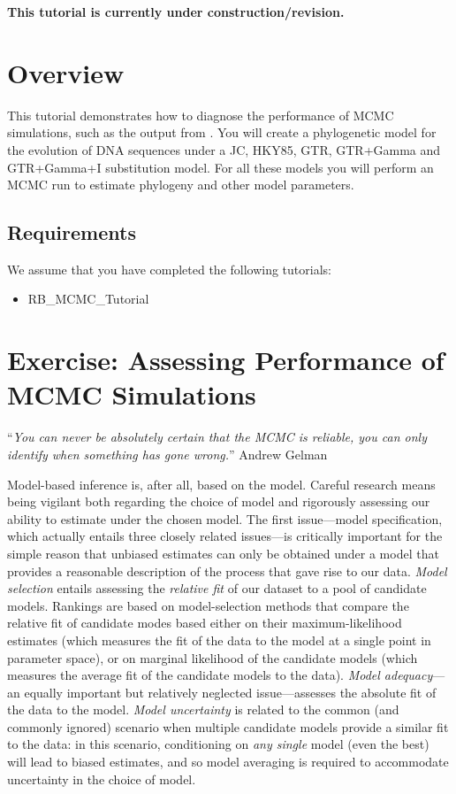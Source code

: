 \bigskip
\begin{center}
\textbf{\Large \color{red}This tutorial is currently under construction/revision.}
\end{center}
\bigskip



\section{Overview}


This tutorial demonstrates how to diagnose the performance of MCMC simulations, such as the output from \RevBayes.
You will create a phylogenetic model for the evolution of DNA sequences under a JC, HKY85, GTR, GTR+Gamma and GTR+Gamma+I substitution model.
For all these models you will perform an MCMC run to estimate phylogeny and other model parameters.

\subsection*{Requirements}
We assume that you have completed the following tutorials:
\begin{itemize}
\item RB\_MCMC\_Tutorial
\end{itemize}



\newpage
\FloatBarrier
\section{Exercise: Assessing Performance of MCMC Simulations}

``{\it You can never be absolutely certain that the MCMC is reliable, you can only identify when something has gone wrong.}'' Andrew Gelman

\bigskip
Model-based inference is, after all, based on the model.
Careful research means being vigilant both regarding the choice of model and rigorously assessing our ability to estimate under the chosen model. 
The first issue---model specification, which actually entails three closely related issues---is critically important for the simple reason that unbiased estimates can only be obtained under a model that provides a reasonable description of the process that gave rise to our data. 
{\it Model selection} entails assessing the {\it relative fit} of our dataset to a pool of candidate models. 
Rankings are based on model-selection methods that compare the relative fit of candidate modes based either on their maximum-likelihood estimates (which measures the fit of the data to the model at a single point in parameter space), or on marginal likelihood of the candidate models (which measures the average fit of the candidate models to the data). 
{\it Model adequacy}---an equally important but relatively neglected issue---assesses the absolute fit of the data to the model. 
{\it Model uncertainty} is related to the common (and commonly ignored) scenario when multiple candidate models provide a similar fit to the data: in this scenario, conditioning on {\it any single} model (even the best) will lead to biased estimates, and so model averaging is required to accommodate uncertainty in the choice of model.

